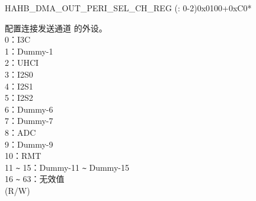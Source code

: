 \begin{register}{H}{AHB\_DMA\_OUT\_PERI\_SEL\_CH\_REG (: 0-2)}{0x0100+0xC0*}\label{regdesc:AHBDMAOUTPERISELCHNREG}
%
%
\regnewline%
\begin{regdesc}\begin{reglist}
\label{fielddesc:AHBDMAPERIOUTSELCHN}\item [AHB\_DMA\_PERI\_OUT\_SEL\_CH\regindex{n}] 配置连接发送通道  的外设。\\
0：I3C\\
1：Dummy-1\\
2：UHCI\\
3：I2S0\\
4：I2S1\\
5：I2S2\\
6：Dummy-6\\
7：Dummy-7\\
8：ADC\\
9：Dummy-9\\
10：RMT\\
11 \verb+~+ 15：Dummy-11 \verb+~+ Dummy-15\\
16 \verb+~+ 63：无效值\\
(R/W)
\end{reglist}\end{regdesc}
\end{register}


